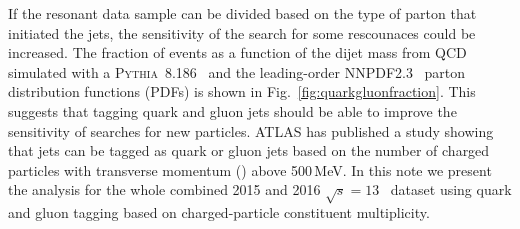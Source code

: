
If the resonant data sample can be divided based on the type of
parton that initiated the jets, the sensitivity of the search for some
rescounaces could be increased. 
The fraction of events as a function of  
the dijet mass from QCD  simulated with a  \textsc{Pythia~8.186}~\cite{pythia8} and the leading-order NNPDF2.3~\cite{Ball:2012cx} 
parton distribution functions (PDFs) is shown in Fig.~\ref{fig:quarkgluonfraction}. 
This suggests that tagging quark and gluon jets should be able to improve the sensitivity of searches for new particles. 
ATLAS has published a study \cite{ATL-PHYS-PUB-2017-009} showing that jets can be tagged as quark or gluon jets 
based on the number of charged particles with transverse momentum (\pt ) above 500\,MeV. 
In this note we present the analysis for the whole combined 2015 and
2016 $\sqrt{s} = 13$~\TeV\xspace dataset using quark 
and gluon tagging  based on charged-particle constituent multiplicity.

